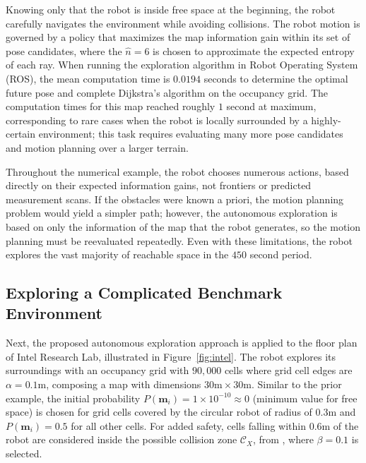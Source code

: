 Knowing only that the robot is inside free space at the beginning, the robot carefully navigates the environment while avoiding collisions. The robot motion is governed by a policy that maximizes the map information gain within its set of pose candidates, where the $\hat n=6$ is chosen to approximate the expected entropy of each ray. 
When running the exploration algorithm in Robot Operating System (ROS), the mean computation time is $0.0194$ seconds to determine the optimal future pose and complete Dijkstra's algorithm on the occupancy grid.
The computation times for this map reached roughly $1$ second at maximum, corresponding to rare cases when the robot is locally surrounded by a highly-certain environment; this task requires evaluating many more pose candidates and motion planning over a larger terrain.

Throughout the numerical example, the robot chooses numerous actions, based directly on their expected information gains, not frontiers or predicted measurement scans. If the obstacles were known a priori, the motion planning problem would yield a simpler path; however, the autonomous exploration is based on only the information of the map that the robot generates, so the motion planning must be reevaluated repeatedly. Even with these limitations, the robot explores the vast majority of reachable space in the $450$ second period. 





\subsection{Exploring a Complicated Benchmark Environment}

Next, the proposed autonomous exploration approach is applied to the floor plan of Intel Research Lab, illustrated in Figure~\ref{fig:intel}.
The robot explores its surroundings with an occupancy grid with $90,000$ cells where grid cell edges are $\alpha=0.1$m, composing a map with dimensions $30\text{m}\times30\text{m}$.
Similar to the prior example, the initial probability $P(\mathbf{m}_i)=1\times10^{-10}\approx0$ (minimum value for free space) is chosen for grid cells covered by the circular robot of radius of $0.3$m and $P(\mathbf{m}_i)=0.5$ for all other cells.
For added safety, cells falling within $0.6$m of the robot are considered inside the possible collision zone $\mathcal{C}_X$, from , where $\beta=0.1$ is selected. 

